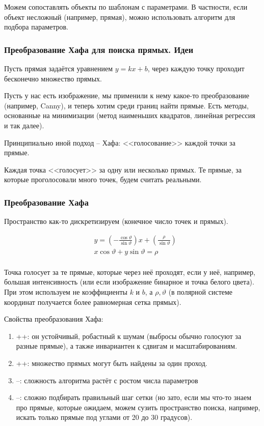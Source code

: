 \documentclass[main.tex]{subfiles}
\begin{document}
Можем сопоставлять объекты по шаблонам с параметрами.
В частности, если объект несложный (например, прямая), можно использовать алгоритм для подбора параметров.

\subsubsection{Преобразование Хафа для поиска прямых. Идеи}

Пусть прямая задаётся уравнением $ y = kx + b $, через каждую точку проходит бесконечно множество прямых.

Пусть у нас есть изображение, мы применили к нему какое-то преобразование (например, Canny), и теперь хотим среди границ найти прямые.
Есть методы, основанные на минимизации (метод наименьших квадратов, линейная регрессия и так далее).

Принципиально иной подход -- Хафа: <<голосование>> каждой точки за прямые.

Каждая точка <<голосует>> за одну или несколько прямых.
Те прямые, за которые проголосовали много точек, будем считать реальными.

\subsubsection{Преобразование Хафа}

Пространство как-то дискретизируем (конечное число точек и прямых).

\begin{align*}
	& y = \left(- \frac{\cos \vartheta}{\sin \vartheta}\right)x + \left(\frac{\rho}{\sin \vartheta}\right) \\
	& x \cos \vartheta + y \sin \vartheta = \rho \\
\end{align*}

Точка голосует за те прямые, которые через неё проходят, если у неё, например, большая интенсивность (или если изображение бинарное и точка белого цвета).
При этом используем не коэффициенты $ k $ и $ b $, а $ \rho, \vartheta $ (в полярной системе координат получается более равномерная сетка прямых).

Свойства преобразования Хафа:

\begin{enumerate}[noitemsep]
	\item ++: он устойчивый, робастный к шумам (выбросы обычно голосуют за разные прямые), а также инвариантен к сдвигам и масштабированиям.
	\item ++: множество прямых могут быть найдены за один проход.
	\item --: сложность алгоритма растёт с ростом числа параметров
	\item --: сложно подбирать правильный шаг сетки (но зато, если мы что-то знаем про прямые, которые ожидаем, можем сузить пространство поиска, например, искать только прямые под углами от 20 до 30 градусов).
\end{enumerate}
\end{document}
